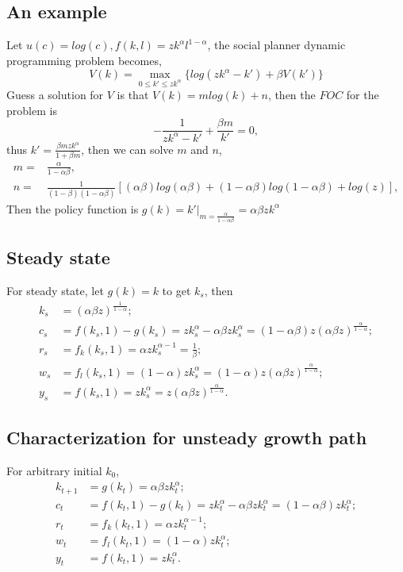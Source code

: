 \documentclass[12pt,notitlepage]{article}%
\numberwithin{equation}{section}
\begin{document}
		\subsection{An example}
			Let $u(c)=log(c), f(k,l)=zk^{\alpha}l^{1-\alpha}$, the social planner dynamic programming problem becomes,
			\begin{equation*}
				V(k)=\max_{0\leq k'\leq zk^{\alpha}} \{log(zk^{\alpha}-k')+\beta V(k')\}
			\end{equation*}
			Guess a solution for $V$ is that $V(k)=mlog(k)+n$, then the $FOC$ for the problem is $$-\frac{1}{zk^{\alpha}-k'}+\frac{\beta m}{k'}=0,$$ thus $k'=\frac{\beta mzk^{\alpha}}{1+\beta m}$, then we can solve $m$ and $n$,
			\begin{equation*}
			\begin{split}
				m=&\frac{\alpha}{1-\alpha \beta},\\
				n=&\frac{1}{(1-\beta)(1-\alpha \beta)}[(\alpha \beta)log(\alpha \beta)+(1-\alpha \beta)log(1-\alpha \beta)+log(z)],
			\end{split}
			\end{equation*}
			Then the policy function is $g(k)=k'|_{m=\frac{\alpha}{1-\alpha \beta}}=\alpha \beta zk^{\alpha}$
		
		\subsection{Steady state}
			For steady state, let $g(k)=k$ to get $k_s$, then
			\begin{equation*}
			\begin{split}
				k_s&=(\alpha \beta z)^{\frac{1}{1-\alpha}};\\
				c_s&=f(k_s,1)-g(k_s)=zk_s^{\alpha}-\alpha \beta zk_s^{\alpha}=(1-\alpha \beta)z(\alpha \beta z)^{\frac{\alpha}{1-\alpha}};\\
				r_s&=f_k(k_s,1)=\alpha zk_s^{\alpha -1}=\frac{1}{\beta};\\
				w_s&=f_l(k_s,1)=(1-\alpha) zk_s^{\alpha}=(1-\alpha) z(\alpha \beta z)^{\frac{\alpha}{1-\alpha}};\\
				y_s&=f(k_s,1)=zk_s^{\alpha}=z(\alpha \beta z)^{\frac{\alpha}{1-\alpha}}.
			\end{split}
			\end{equation*} 
		
		\subsection{Characterization for unsteady growth path}
			For arbitrary initial $k_0$,
			\begin{equation*}
			\begin{split}
				k_{t+1}&=g(k_t)=\alpha \beta z k_t^{\alpha};\\
				c_t&=f(k_t,1)-g(k_t)=zk_t^{\alpha}-\alpha \beta zk_t^{\alpha}=(1-\alpha \beta)zk_t^{\alpha};\\
				r_t&=f_k(k_t,1)=\alpha zk_t^{\alpha -1};\\
				w_t&=f_l(k_t,1)=(1-\alpha) zk_t^{\alpha};\\
				y_t&=f(k_t,1)=zk_t^{\alpha}.
			\end{split}
			\end{equation*} 
	\setcounter{table}{0}
	
\end{document}
